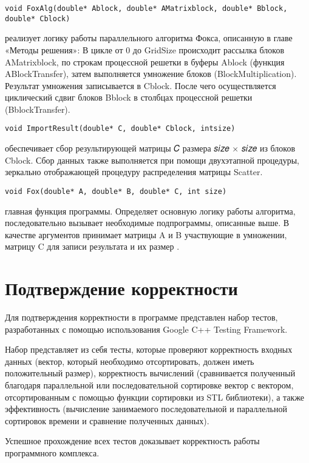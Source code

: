 \documentclass{report}
\begin{document}
\begin{lstlisting}
void FoxAlg(double* Ablock, double* AMatrixblock, double* Bblock, double* Cblock)
\end{lstlisting}
реализует логику работы параллельного алгоритма Фокса, описанную в главе «Методы решения»: В цикле от 0 до GridSize происходит рассылка блоков AMatrixblock, по строкам процессной решетки в буферы Ablock (функция ABlockTransfer), затем выполняется умножение блоков (BlockMultiplication). Результат умножения записывается в Cblock. После чего осуществляется циклический сдвиг блоков Bblock в столбцах процессной решетки (BblockTransfer).

\begin{lstlisting}
void ImportResult(double* C, double* Cblock, intsize)
\end{lstlisting}
обеспечивает сбор результирующей матрицы 𝐶 размера 𝑠𝑖𝑧𝑒 × 𝑠𝑖𝑧𝑒 из блоков Cblock. Сбор данных также выполняется при помощи двухэтапной процедуры, зеркально отображающей процедуру распределения матрицы Scatter.
\begin{lstlisting}
void Fox(double* A, double* B, double* C, int size)
\end{lstlisting}
главная функция программы. Определяет основную логику работы алгоритма, последовательно вызывает необходимые подпрограммы, описанные выше. В качестве аргументов принимает матрицы A и B участвующие в умножении, матрицу C для записи результата и их размер .
\newpage

\section*{Подтверждение корректности}
Для подтверждения корректности в программе представлен набор тестов, разработанных с помощью использования Google C++ Testing Framework.
\par Набор представляет из себя тесты, которые проверяют корректность входных данных (вектор, который необходимо отсортировать, должен иметь положительный размер), корректность вычислений (сравнивается полученный благодаря параллельной или последовательной сортировке вектор с вектором, отсортированным с помощью функции сортировки из STL библиотеки), а также эффективность (вычисление занимаемого последовательной и параллельной сортировок времени и сравнение полученных данных).
\par Успешное прохождение всех тестов доказывает корректность работы программного комплекса.
\newpage
\end{document}
